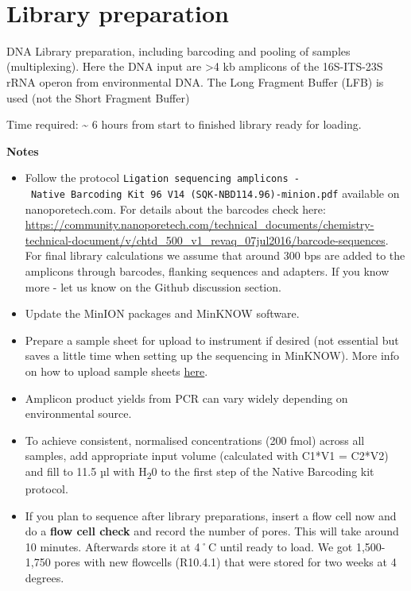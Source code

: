 \documentclass[
]{book}
\providecommand{\tightlist}{%
  \setlength{\itemsep}{0pt}\setlength{\parskip}{0pt}}
\begin{document}
~

\section{Library preparation}\label{library-preparation}

DNA Library preparation, including barcoding and pooling of samples (multiplexing). Here the DNA input are \textgreater4 kb amplicons of the 16S-ITS-23S rRNA operon from environmental DNA. The Long Fragment Buffer (LFB) is used (not the Short Fragment Buffer)

Time required: \textasciitilde{} 6 hours from start to finished library ready for loading.

\textbf{Notes}

\begin{itemize}
\tightlist
\item
  Follow the protocol \texttt{Ligation\ sequencing\ amplicons\ -\ Native\ Barcoding\ Kit\ 96\ V14\ (SQK-NBD114.96)-minion.pdf} available on nanoporetech.com. For details about the barcodes check here: \url{https://community.nanoporetech.com/technical_documents/chemistry-technical-document/v/chtd_500_v1_revaq_07jul2016/barcode-sequences}. For final library calculations we assume that around 300 bps are added to the amplicons through barcodes, flanking sequences and adapters. If you know more - let us know on the Github discussion section.
\item
  Update the MinION packages and MinKNOW software.
\item
  Prepare a sample sheet for upload to instrument if desired (not essential but saves a little time when setting up the sequencing in MinKNOW). More info on how to upload sample sheets \href{https://community.nanoporetech.com/docs/prepare/library_prep_protocols/experiment-companion-minknow/v/mke_1013_v1_revdc_11apr2016/sample-sheet-upload}{here}.
\item
  Amplicon product yields from PCR can vary widely depending on environmental source.
\item
  To achieve consistent, normalised concentrations (200 fmol) across all samples, add appropriate input volume (calculated with C1*V1 = C2*V2) and fill to 11.5 µl with H\textsubscript{2}0 to the first step of the Native Barcoding kit protocol.
\item
  If you plan to sequence after library preparations, insert a flow cell now and do a \textbf{flow cell check} and record the number of pores. This will take around 10 minutes. Afterwards store it at 4˚C until ready to load. We got 1,500-1,750 pores with new flowcells (R10.4.1) that were stored for two weeks at 4 degrees.
\end{itemize}
\end{document}
